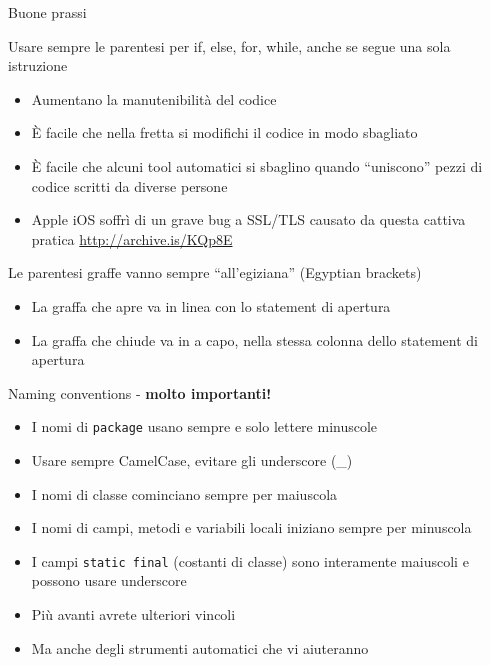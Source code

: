 \documentclass[presentation]{beamer}
\begin{document}
\begin{frame}[allowframebreaks]{Buone prassi}
	\begin{block}{Usare sempre le parentesi per if, else, for, while, anche se segue una sola istruzione}
		\begin{itemize}
			\item Aumentano la manutenibilità del codice
			\item È facile che nella fretta si modifichi il codice in modo sbagliato
			\item È facile che alcuni tool automatici si sbaglino quando ``uniscono'' pezzi di codice scritti da diverse persone
			\item Apple iOS soffrì di un grave bug a SSL/TLS causato da questa cattiva pratica \url{http://archive.is/KQp8E}
		\end{itemize}
	\end{block}
	\begin{block}{Le parentesi graffe vanno sempre ``all'egiziana'' (Egyptian brackets)}
		\begin{itemize}
			\item La graffa che apre va in linea con lo statement di apertura
			\item La graffa che chiude va in a capo, nella stessa colonna dello statement di apertura
		\end{itemize}
	\end{block}
	\begin{block}{Naming conventions - \textbf{molto importanti!}}
		\begin{itemize}
			\item I nomi di \texttt{package} usano sempre e solo lettere minuscole
			\item Usare sempre CamelCase, evitare gli underscore (\_)
			\item I nomi di classe cominciano sempre per maiuscola
			\item I nomi di campi, metodi e variabili locali iniziano sempre per minuscola
			\item I campi \texttt{static final} (costanti di classe) sono interamente maiuscoli e possono usare underscore
		\end{itemize}
	\end{block}
	\begin{itemize}
		\item Più avanti avrete ulteriori vincoli
		\item Ma anche degli strumenti automatici che vi aiuteranno
	\end{itemize}
\end{frame}
\end{document}
